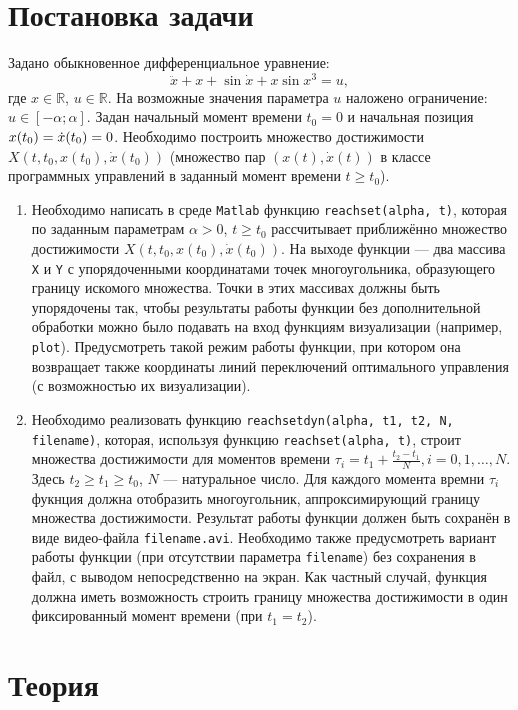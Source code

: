 \documentclass[11pt]{article}
\newcommand*{\hm}[1]{#1\nobreak\discretionary{}{\hbox{$\mathsurround=0pt #1$}}{}}
\begin{document}
\section{Постановка задачи}
Задано обыкновенное дифференциальное уравнение:
$$
\ddot{x} + x + \sin \dot{x} + x \sin x^3 = u,
$$
где $x \in \mathbb{R}$, $u \in \mathbb{R}$. На возможные значения параметра $u$ наложено ограничение: $u \in [-\alpha; \alpha]$. Задан начальный момент времени $t_0 = 0$ и начальная позиция $x(t_0) = \dot{x}(t_0) \hm= 0$. Необходимо построить множество достижимости $X(t, t_0, x(t_0), \dot{x}(t_0))$ (множество пар $(x(t), \dot{x}(t))$ в классе программных управлений в заданный момент времени $t \geqslant t_0$).
\begin{enumerate}
\item
Необходимо написать в среде \texttt{Matlab} функцию \texttt{reachset(alpha, t)}, которая по заданным параметрам $\alpha > 0$, $t \geqslant t_0$ рассчитывает приближённо множество достижимости $X(t, t_0, x(t_0), \dot{x}(t_0))$. На выходе функции --- два массива \texttt{X} и \texttt{Y} с упорядоченными координатами точек многоугольника, образующего границу искомого множества. Точки в этих массивах должны быть упорядочены так, чтобы результаты работы функции без дополнительной обработки можно было подавать на вход функциям визуализации (например, \texttt{plot}). Предусмотреть такой режим работы функции, при котором она возвращает также координаты линий переключений оптимального управления (с возможностью их визуализации).
\item
Необходимо реализовать функцию \texttt{reachsetdyn(alpha, t1, t2, N, filename)}, которая, используя функцию \texttt{reachset(alpha, t)}, строит множества достижимости для моментов времени $\tau_i = t_1 + \tfrac{t_2 - t_1}{N}, i = 0, 1, \ldots, N$. Здесь $t_2 \geqslant t_1 \geqslant t_0$, $N$ --- натуральное число. Для каждого момента времни $\tau_i$ фукнция должна отобразить многоугольник, аппроксимирующий границу множества достижимости. Результат работы функции должен быть сохранён в виде видео-файла \texttt{filename.avi}. Необходимо также предусмотреть вариант работы функции (при отсутствии параметра \texttt{filename}) без сохранения в файл, с выводом непосредственно на экран. Как частный случай, функция должна иметь возможность строить границу множества достижимости в один фиксированный момент времени (при $t_1 = t_2$).
\end{enumerate}
\section{Теория}
\end{document}
